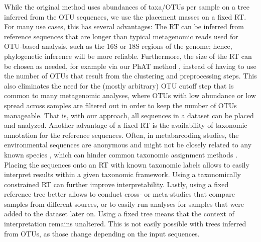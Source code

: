 While the original method uses abundances of taxa/OTUs per sample on a tree inferred from the OTU sequences,
we use the placement masses on a fixed \acf{RT}.
For many use cases, this has several advantages:
The \ac{RT} can be inferred from reference sequences that are longer
than typical metagenomic reads used for OTU-based analysis, such as the 16S or 18S regions of the genome;
hence, phylogenetic inference will be more reliable.
Furthermore, the size of the \ac{RT} can be chosen as needed,
for example via our \acf{PhAT} method \cite{Czech2018},
instead of having to use the number of OTUs that result from the clustering and preprocessing steps.
This also eliminates the need for the (mostly arbitrary) OTU cutoff step that is common to many metagenomic analyses,
where OTUs with low abundance or low spread across samples are filtered out in order to keep the number of OTUs manageable.
That is, with our approach, all sequences in a dataset can be placed and analyzed.
Another advantage of a fixed \ac{RT} is the availability of taxonomic annotation for the reference sequences.
Often, in metabarcoding studies, the environmental sequences are anonymous
and might not be closely related to any known species \cite{Karsenti2011,Sunagawa2015,Mahe2017},
which can hinder common taxonomic assignment methods \cite{Koski2001}.
Placing the sequences onto an \ac{RT} with known taxonomic labels %
allows to easily interpret results within a given taxonomic framework.
Using a taxonomically constrained \ac{RT} can further improve interpretability.
Lastly, using a fixed reference tree better allows to conduct cross- or meta-studies
that compare samples from different sources, or to easily run analyses for samples that were added to the dataset later on.
Using a fixed tree means that the context of interpretation remains unaltered.
This is not easily possible with trees inferred from OTUs, as those change depending on the input sequences.

